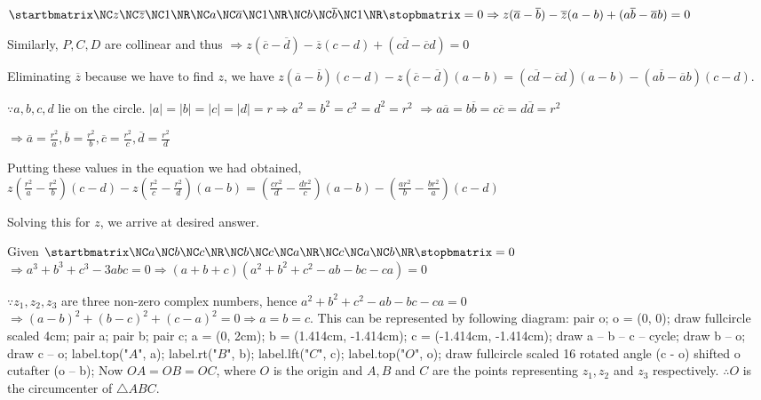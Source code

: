   $\startbmatrix\NC z \NC \overline{z} \NC 1\NR\NC a \NC \overline{a} \NC 1\NR\NC b \NC \overline{b} \NC
  1\NR\stopbmatrix = 0 \Rightarrow z(\overline{a} - \overline{b}) - \overline{z}(a - b) + (a\overline{b} -
  \overline{a}b) = 0$

  Similarly, $P, C, D$ are collinear and thus
  $\Rightarrow z(\overline{c} - \overline{d}) - \overline{z}(c - d) + (c\overline{d} - \overline{c}d) = 0$

  Eliminating $\overline{z}$ because we have to find $z$, we have
  $z(\overline{a} - \overline{b})(c - d) - z(\overline{c} - \overline{d})(a - b) = (c\overline{d} -
  \overline{c}d)(a - b) - (a\overline{b} - \overline{a}b)(c - d)$.

  $\because a, b, c, d$ lie on the circle. $|a| = |b| = |c| = |d| = r \Rightarrow a^2 = b^2 = c^2 = d^2 = r^2$
  $\Rightarrow a\overline{a} = b\overline{b} = c\overline{c} = d\overline{d} = r^2$

  $\Rightarrow \overline{a} = \frac{r^2}{a}, \overline{b} = \frac{r^2}{b}, \overline{c} = \frac{r^2}{c},
  \overline{d} = \frac{r^2}{d}$

  Putting these values in the equation we had obtained,
  $z\left(\frac{r^2}{a} - \frac{r^2}{b}\right)(c - d) - z\left(\frac{r^2}{c} - \frac{r^2}{d}\right)(a - b) = \left(\frac{cr^2}{d} -
  \frac{dr^2}{c}\right)(a - b) - \left(\frac{ar^2}{b} - \frac{br^2}{a}\right)(c - d)$

  Solving this for $z$, we arrive at desired answer.
\item Given $\startbmatrix\NC a \NC b \NC c\NR\NC b \NC c \NC a\NR\NC c \NC a \NC b\NR\stopbmatrix = 0$
    $\Rightarrow a^3 + b^3 + c^3 - 3abc = 0\Rightarrow (a + b + c)(a^2 + b^2 + c^2 - ab - bc - ca) = 0$

    $\because z_1, z_2, z_3$ are three non-zero complex numbers, hence $a^2 + b^2 + c^2 - ab - bc - ca = 0$
    $\Rightarrow (a - b)^2 + (b - c)^2 + (c - a)^2 = 0 \Rightarrow a = b = c$. This can be represented by
  following diagram:
  \startplacefigure[location={left,none}]
    \startMPcode
      pair o;
      o = (0, 0);
      draw fullcircle scaled 4cm;
      pair a; pair b; pair c;
      a = (0, 2cm); b = (1.414cm, -1.414cm);
      c = (-1.414cm, -1.414cm);
      draw a -- b -- c -- cycle;
      draw b -- o;
      draw c -- o;
      label.top("$A$", a);
      label.rt("$B$", b);
      label.lft("$C$", c);
      label.top("$O$", o);
      draw fullcircle scaled 16 rotated angle (c - o) shifted o cutafter (o -- b);
    \stopMPcode
  \stopplacefigure
  Now $OA=OB=OC$, where $O$ is the origin and $A, B$ and $C$ are the points representing $z_1, z_2$ and $z_3$ respectively.
  $\therefore O$ is the circumcenter of $\triangle ABC$.

